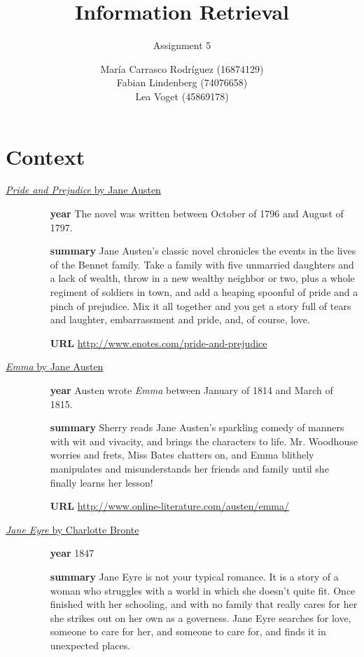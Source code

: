\documentclass[a4paper,11pt,oneside]{book}
\title{Information Retrieval }
\subtitle{Assignment 5}
\author{ María Carrasco Rodríguez (16874129) \\
		Fabian Lindenberg (74076658)\\
		Lea Voget (45869178)}
\begin{document}
\kostspieligmaketitle


\chapter{Context}
\begin{description}
\item [\underline{{\it Pride and Prejudice} by Jane Austen}]  
	\begin{itemize}
	\item [{\bf year}] The novel was written between October of 1796 and August of 1797.
	\item [{\bf summary}] Jane Austen’s classic novel chronicles the events in the lives of the Bennet family. Take a family with five unmarried daughters and a lack of wealth, throw in a new wealthy neighbor or two, plus a whole regiment of soldiers in town, and add a heaping spoonful of pride and a pinch of prejudice. Mix it all together and you get a story full of tears and laughter, embarrassment and pride, and, of course, love.
	\item [{\bf URL}] \url{http://www.enotes.com/pride-and-prejudice}
	\end{itemize}
\item [\underline{{\it Emma} by Jane Austen}]  
	\begin{itemize}
	\item [{\bf year}] Austen wrote {\it Emma} between January of 1814 and March of 1815.
	\item [{\bf summary}] Sherry reads Jane Austen’s sparkling comedy of manners with wit and vivacity, and brings the characters to life. Mr. Woodhouse worries and frets, Miss Bates chatters on, and Emma blithely manipulates and misunderstands her friends and family until she finally learns her lesson! 
	\item [{\bf URL}] \url{http://www.online-literature.com/austen/emma/}
	\end{itemize}
\item [\underline{{\it Jane Eyre} by Charlotte Bronte}] 
	\begin{itemize}
	\item [{\bf year}] 1847
	\item [{\bf summary}] Jane Eyre is not your typical romance. It is a story of a woman who struggles with a world in which she doesn’t quite fit. Once finished with her schooling, and with no family that really cares for her she strikes out on her own as a governess. Jane Eyre searches for love, someone to care for her, and someone to care for, and finds it in unexpected places.

\end{itemize}
\end{description}
\end{document}
